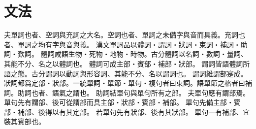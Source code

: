 \chapter*{文法}
夫單詞也者、空詞與充詞之大名。空詞也者、單詞之未備字與音而具義。充詞也者、單詞之均有字與音與義。
漢文單詞品以體詞・謂詞・狀詞・束詞・補詞・助詞・歎詞。
體詞咸語生物・死物・地物・時物。古分體詞以名詞・數詞・量詞、其能不分、名之以體詞也。
體詞可成主部・賓部・補部・狀部。
謂詞皆語體詞所語之態。古分謂詞以動詞與形容詞、其能不分、名以謂詞也。
謂詞維謂部寔成。
狀詞都爲定部・狀部。一統單詞・單節・單句・複句者曰束詞。語單節之格者曰補詞。助詞也者、語氣之謂也。
助詞結單句與單句所有之部。
夫單句應有謂部焉。
單句先有謂部、後可從謂部而具主部・狀部・賓部・補部。
單句先備主部・賓部・補部、後得以有其定部。
若單句先有狀部、後有其狀部。
單句一有補部、宜裝其賓部也。

